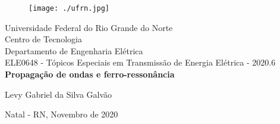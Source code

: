 \onehalfspacing
\begin{titlepage}
	\begin{center}
	
	\begin{figure}[!ht]
	\centering
	\texttt{[image: ./ufrn.jpg]}
	\end{figure}
		Universidade Federal do Rio Grande do Norte \\ Centro de Tecnologia \\ Departamento de Engenharia Elétrica \\ ELE0648 - Tópicos Especiais em Transmissão de Energia Elétrica  - 2020.6 \\
		\vspace{15pt}
        \vspace{95pt}
        \textbf{\Large{Propagação de ondas e ferro-ressonância}}\\
		\vspace{3,5cm}
	\end{center}
	
	\begin{flushright}
			\item Levy Gabriel da Silva Galvão 
 	\end{flushright}
	\vspace{1cm}
	
	\begin{center}
		\vspace{\fill}
		Natal - RN, Novembro de 2020
	\end{center}
\end{titlepage}




